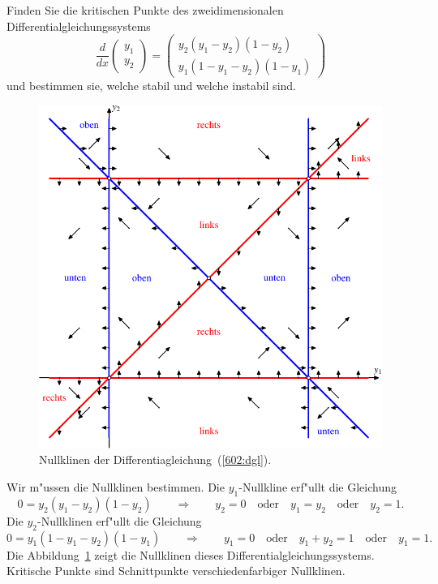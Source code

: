 Finden Sie die kritischen Punkte des zweidimensionalen
Differentialgleichungssystems
\begin{equation}
\frac{d}{dx}\begin{pmatrix}y_1\\y_2\end{pmatrix}
=
\begin{pmatrix}
y_2(y_1-y_2)(1-y_2)\\
y_1(1-y_1-y_2)(1-y_1)
\end{pmatrix}
\label{602:dgl}
\end{equation}
und bestimmen sie, welche stabil und welche instabil sind.

\begin{loesung}
\begin{figure}
\centering
\includegraphics{../skript/uebungsaufgaben/602-1.pdf}
\caption{Nullklinen der Differentiagleichung~(\ref{602:dgl}).
\label{602:nullklinen}}
\end{figure}
Wir m"ussen die Nullklinen bestimmen.
Die $y_1$-Nullkline erf"ullt die Gleichung
\[
0=y_2(y_1-y_2)(1-y_2)
\qquad\Rightarrow\qquad
y_2=0
\quad\text{oder}\quad
y_1=y_2
\quad\text{oder}\quad
y_2=1.
\]
Die $y_2$-Nullklinen erf"ullt die Gleichung
\[
0=y_1(1-y_1-y_2)(1-y_1)
\qquad\Rightarrow\qquad
y_1=0
\quad\text{oder}\quad
y_1+y_2=1
\quad\text{oder}\quad
y_1=1.
\]
Die Abbildung~\ref{602:nullklinen} zeigt die Nullklinen dieses
Differentialgleichungssystems. 
Kritische Punkte sind Schnittpunkte verschiedenfarbiger Nullklinen.


\end{loesung}
